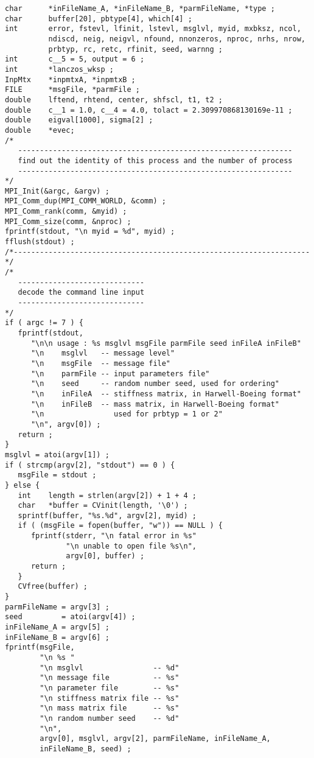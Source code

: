 \begin{verbatim}
char      *inFileName_A, *inFileName_B, *parmFileName, *type ;
char      buffer[20], pbtype[4], which[4] ;
int       error, fstevl, lfinit, lstevl, msglvl, myid, mxbksz, ncol, 
          ndiscd, neig, neigvl, nfound, nnonzeros, nproc, nrhs, nrow, 
          prbtyp, rc, retc, rfinit, seed, warnng ;
int       c__5 = 5, output = 6 ;
int       *lanczos_wksp ;
InpMtx    *inpmtxA, *inpmtxB ;
FILE      *msgFile, *parmFile ;
double    lftend, rhtend, center, shfscl, t1, t2 ;
double    c__1 = 1.0, c__4 = 4.0, tolact = 2.309970868130169e-11 ;
double    eigval[1000], sigma[2] ;
double    *evec;
/*
   ---------------------------------------------------------------
   find out the identity of this process and the number of process
   ---------------------------------------------------------------
*/
MPI_Init(&argc, &argv) ;
MPI_Comm_dup(MPI_COMM_WORLD, &comm) ;
MPI_Comm_rank(comm, &myid) ;
MPI_Comm_size(comm, &nproc) ;
fprintf(stdout, "\n myid = %d", myid) ;
fflush(stdout) ;
/*--------------------------------------------------------------------*/
/*
   -----------------------------
   decode the command line input
   -----------------------------
*/
if ( argc != 7 ) {
   fprintf(stdout, 
      "\n\n usage : %s msglvl msgFile parmFile seed inFileA inFileB"
      "\n    msglvl   -- message level"
      "\n    msgFile  -- message file"
      "\n    parmFile -- input parameters file"
      "\n    seed     -- random number seed, used for ordering"
      "\n    inFileA  -- stiffness matrix, in Harwell-Boeing format"
      "\n    inFileB  -- mass matrix, in Harwell-Boeing format"
      "\n                used for prbtyp = 1 or 2"
      "\n", argv[0]) ;
   return ;
}
msglvl = atoi(argv[1]) ;
if ( strcmp(argv[2], "stdout") == 0 ) {
   msgFile = stdout ;
} else {
   int    length = strlen(argv[2]) + 1 + 4 ;
   char   *buffer = CVinit(length, '\0') ;
   sprintf(buffer, "%s.%d", argv[2], myid) ;
   if ( (msgFile = fopen(buffer, "w")) == NULL ) {
      fprintf(stderr, "\n fatal error in %s"
              "\n unable to open file %s\n",
              argv[0], buffer) ;
      return ;
   }
   CVfree(buffer) ;
}
parmFileName = argv[3] ;
seed         = atoi(argv[4]) ;
inFileName_A = argv[5] ;
inFileName_B = argv[6] ;
fprintf(msgFile, 
        "\n %s "
        "\n msglvl                -- %d" 
        "\n message file          -- %s" 
        "\n parameter file        -- %s" 
        "\n stiffness matrix file -- %s" 
        "\n mass matrix file      -- %s" 
        "\n random number seed    -- %d"
        "\n",
        argv[0], msglvl, argv[2], parmFileName, inFileName_A, 
        inFileName_B, seed) ;

\end{verbatim}
